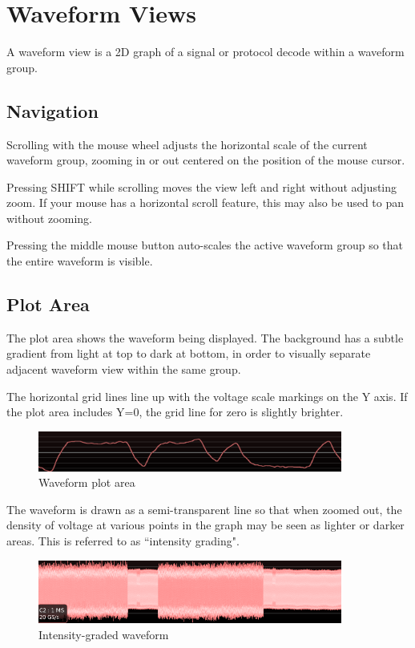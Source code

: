 \chapter{Waveform Views}

A waveform view is a 2D graph of a signal or protocol decode within a waveform group.

\section{Navigation}

Scrolling with the mouse wheel adjusts the horizontal scale of the current waveform group, zooming in or out centered
on the position of the mouse cursor.

Pressing SHIFT while scrolling moves the view left and right without adjusting zoom. If your mouse has a horizontal
scroll feature, this may also be used to pan without zooming.

Pressing the middle mouse button auto-scales the active waveform group so that the entire waveform is visible.

\section{Plot Area}

The plot area shows the waveform being displayed. The background has a subtle gradient from light at top to dark at
bottom, in order to visually separate adjacent waveform view within the same group.

The horizontal grid lines line up with the voltage scale markings on the Y axis. If the plot area includes Y=0, the
grid line for zero is slightly brighter.

\begin{figure}[H]
\centering
\includegraphics[width=10cm]{images/waveform-graph.png}
\caption{Waveform plot area}
\label{waveform-graph}
\end{figure}

The waveform is drawn as a semi-transparent line so that when zoomed out, the density of voltage at various points in
the graph may be seen as lighter or darker areas. This is referred to as ``intensity grading".

\begin{figure}[H]
\centering
\includegraphics[width=10cm]{images/graded-waveform.png}
\caption{Intensity-graded waveform}
\label{graded-waveform2}
\end{figure}

